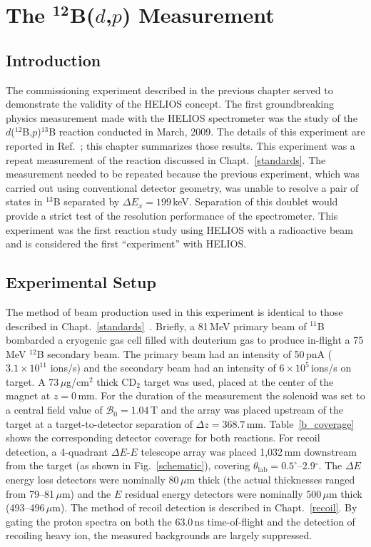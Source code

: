 \chapter[\texorpdfstring{The $^\text{12}$B\lowercase{($d$,$p$)} Measurement}{The 12B(d,p) Measurement}]{\texorpdfstring{The $^\mathbf{12}$B($d$,$p$) Measurement}{The 12B(d,p) Measurement}}
\label{rib_com}
\section{Introduction}
The commissioning experiment described in the previous chapter served to demonstrate the validity of the HELIOS concept.  The first groundbreaking physics measurement made with the HELIOS spectrometer was the study of the $d$($^{12}$B,$p$)$^{13}$B reaction conducted in March, 2009.  The details of this experiment are reported in Ref.~\cite{Schiffer_2010}; this chapter summarizes those results. This experiment was a repeat measurement of the reaction discussed in Chapt.~\ref{standards}.  The measurement needed to be repeated because the previous experiment, which was carried out using conventional detector geometry, was unable to resolve a pair of states in $^{13}$B separated by $\Delta E_x=199$\,keV.  Separation of this doublet would provide a strict test of the resolution performance of the spectrometer.  This experiment was the first reaction study using HELIOS with a radioactive beam and is considered the first ``experiment'' with HELIOS.  

\section{Experimental Setup}
The method of beam production used in this experiment is identical  to those described in Chapt.~\ref{standards}~\cite{Lee_2010}.  Briefly, a 81\,MeV primary beam of $^{11}$B bombarded a cryogenic gas cell filled with deuterium gas to produce in-flight a 75\,MeV $^{12}$B secondary beam.  The primary beam had an intensity of 50\,pnA ($3.1\times 10^{11}$ ions/s) and the secondary beam had an intensity of $6\times 10^5$\,ions/s on target.  A 73\,$\mu$g/cm$^2$ thick CD$_2$ target was used, placed at the center of the magnet at $z=0$\,mm.  For the duration of the measurement the solenoid was set to a central field value of $\mathscr{B}_0=1.04$\,T and the array was placed upstream of the target at a target-to-detector separation of $\Delta z = 368.7$\,mm.  Table~\ref{b_coverage} shows the corresponding detector coverage for both reactions.  For recoil detection, a 4-quadrant $\Delta E$-$E$ telescope array was placed 1,032\,mm downstream from the target (as shown in Fig.~\ref{schematic}), covering $\theta_\mathrm{lab}=0.5^\circ$--2.9$^\circ$.  The $\Delta E$ energy loss detectors were nominally 80\,$\mu$m thick (the actual thicknesses ranged from 79--81\,$\mu$m) and the $E$ residual energy detectors were nominally 500\,$\mu$m thick (493--496\,$\mu$m).  The method of recoil detection is described in Chapt.~\ref{recoil}.  By gating the proton spectra on both the 63.0\,ns time-of-flight and the detection of recoiling heavy ion, the measured backgrounds are largely suppressed. 

